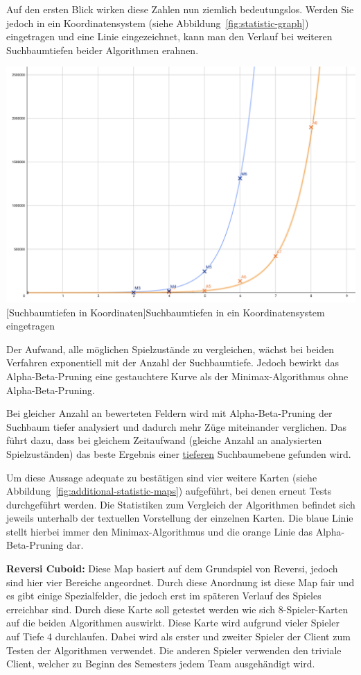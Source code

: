 Auf den ersten Blick wirken diese Zahlen nun ziemlich bedeutungslos.
Werden Sie jedoch in ein Koordinatensystem (siehe Abbildung~\ref{fig:statistic-graph}) eingetragen und eine Linie eingezeichnet, kann man den Verlauf bei weiteren Suchbaumtiefen beider Algorithmen erahnen.

\vspace{1em}
\begin{minipage}{\linewidth}
    \centering
    \includegraphics[width=0.7\linewidth]{pics/statistic-graph}
    [Suchbaumtiefen in Koordinaten]{Suchbaumtiefen in ein Koordinatensystem eingetragen}
    \label{fig:statistic-graph}
\end{minipage}

Der Aufwand, alle m\"oglichen Spielzust\"ande zu vergleichen, w\"achst bei beiden Verfahren exponentiell mit der Anzahl der Suchbaumtiefe.
Jedoch bewirkt das Alpha-Beta-Pruning eine gestauchtere Kurve als der Minimax-Algorithmus ohne Alpha-Beta-Pruning.

Bei gleicher Anzahl an bewerteten Feldern wird mit Alpha-Beta-Pruning der Suchbaum tiefer analysiert und dadurch mehr Z\"uge miteinander verglichen.
Das f\"uhrt dazu, dass bei gleichem Zeitaufwand (\corresponds gleiche Anzahl an analysierten Spielzust\"anden) das beste Ergebnis einer \underline{tieferen} Suchbaumebene gefunden wird.

\newpage

Um diese Aussage adequate zu best\"atigen sind vier weitere Karten (siehe Abbildung~\ref{fig:additional-statistic-maps}) aufgef\"uhrt, bei denen erneut Tests durchgef\"uhrt werden.
Die Statistiken zum Vergleich der Algorithmen befindet sich jeweils unterhalb der textuellen Vorstellung der einzelnen Karten.
Die blaue Linie stellt hierbei immer den Minimax-Algorithmus und die orange Linie das Alpha-Beta-Pruning dar.

\textbf{Reversi Cuboid:}
Diese Map basiert auf dem Grundspiel von Reversi, jedoch sind hier vier Bereiche angeordnet.
Durch diese Anordnung ist diese Map fair und es gibt einige Spezialfelder, die jedoch erst im sp\"ateren Verlauf des Spieles erreichbar sind.
Durch diese Karte soll getestet werden wie sich 8-Spieler-Karten auf die beiden Algorithmen auswirkt.
Diese Karte wird aufgrund vieler Spieler auf Tiefe 4 durchlaufen.
Dabei wird als erster und zweiter Spieler der Client zum Testen der Algorithmen verwendet.
Die anderen Spieler verwenden den triviale Client, welcher zu Beginn des Semesters jedem Team ausgeh\"andigt wird.

